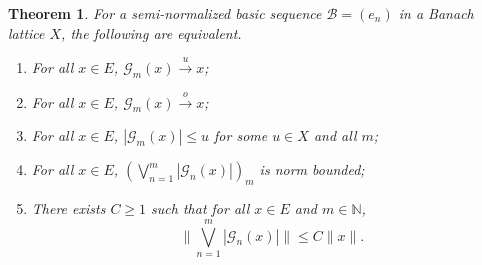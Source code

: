 \documentclass[12pt,leqno]{amsart}
\newtheorem{theorem}{Theorem}[section]
\numberwithin{equation}{section}
\theoremstyle{definition}
\newtheorem{question}[theorem]{Question}
\begin{document}
\begin{theorem}\label{u-greedy theorem.}
For a semi-normalized basic sequence $\mathcal{B}=(e_n)$ in a Banach lattice $X$, the following are equivalent.
\begin{enumerate}
\item For all $x\in E$,  $\mathcal{G}_m(x)\xrightarrow{u}x$;
\item For all $x\in E$, $\mathcal{G}_m(x)\xrightarrow{o}x$;
\item For all $x\in E$, $|\mathcal{G}_m(x)|\leq u$ for some $u\in X$ and all $m$;
\item For all $x\in E$, $(\bigvee_{n=1}^m|\mathcal{G}_n(x)|)_m$ is norm bounded;
\item There exists $C\geq 1$ such that for all $x\in E$ and $m\in \mathbb{N}$,
$$\bigg\|\bigvee_{n=1}^m\left|\mathcal{G}_n(x)\right|\bigg\|\leq C\|x\|.$$
\end{enumerate}

\end{theorem}
\end{document}
